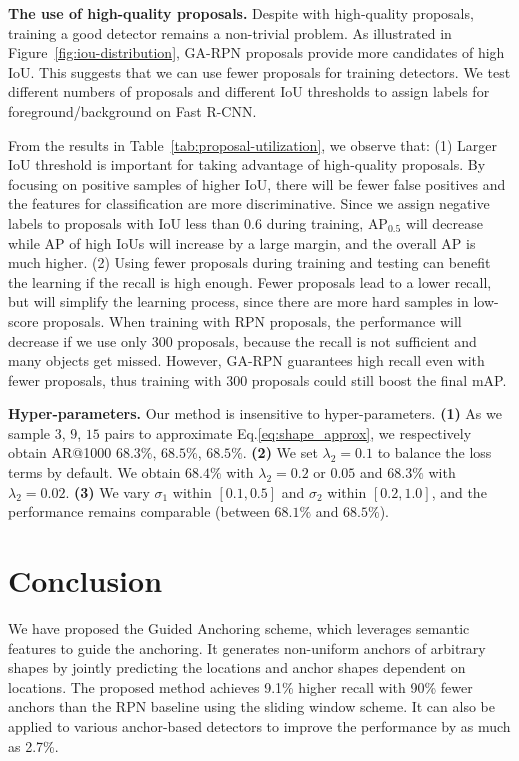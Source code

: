 \documentclass[10pt,twocolumn,letterpaper]{article}
\begin{document}
\noindent
\textbf{The use of high-quality proposals.}
Despite with high-quality proposals, training a good detector remains a non-trivial problem.
As illustrated in Figure~\ref{fig:iou-distribution}, GA-RPN proposals provide
more candidates of high IoU. This suggests that we can use fewer proposals
for training detectors.
We test different numbers of proposals and different IoU thresholds to assign
labels for foreground/background on Fast R-CNN.

From the results in Table~\ref{tab:proposal-utilization}, we observe that:
(1) Larger IoU threshold is important for taking advantage of high-quality proposals.
By focusing on positive samples of higher IoU, there will be fewer false
positives and the features for classification are more discriminative.
Since we assign negative labels to proposals with IoU less than 0.6 during training,
$\text{AP}_{0.5}$ will decrease while AP of high IoUs will
increase by a large margin, and the overall AP is much higher.
(2) Using fewer proposals during training and testing can benefit the learning
if the recall is high enough.
Fewer proposals lead to a lower recall, but will simplify the learning process,
since there are more hard samples in low-score proposals.
When training with RPN proposals, the performance will decrease if we use only
300 proposals, because the recall is not sufficient and many objects get missed.
However, GA-RPN guarantees high recall even with fewer proposals, thus training
with 300 proposals could still boost the final mAP.

\noindent
\textbf{Hyper-parameters.}
Our method is insensitive to hyper-parameters.
\textbf{(1)}
As we sample $3$, $9$, $15$ pairs to approximate Eq.\eqref{eq:shape_approx}, we respectively obtain AR@1000 $68.3\%$, $68.5\%$, $68.5\%$.
\textbf{(2)}
We set $\lambda_2=0.1$ to balance the loss terms by default.
We obtain $68.4\%$ with $\lambda_2 = 0.2 \text{ or } 0.05$ and
$68.3\%$ with $\lambda_2 = 0.02$.
\textbf{(3)}
We vary $\sigma_1$ within $[0.1, 0.5]$ and $\sigma_2$ within $[0.2, 1.0]$,
and the performance remains comparable (between $68.1\%$ and $68.5\%$).
 

\section{Conclusion}
\label{sec:conclusion}

We have proposed the Guided Anchoring scheme, which leverages semantic features
to guide the anchoring. It generates non-uniform anchors of arbitrary shapes by
jointly predicting the locations and anchor shapes dependent on locations.
The proposed method achieves 9.1\% higher recall with 90\% fewer anchors than
the RPN baseline using the sliding window scheme. It can also be applied to
various anchor-based detectors to improve the performance by as much as 2.7\%.
\end{document}

